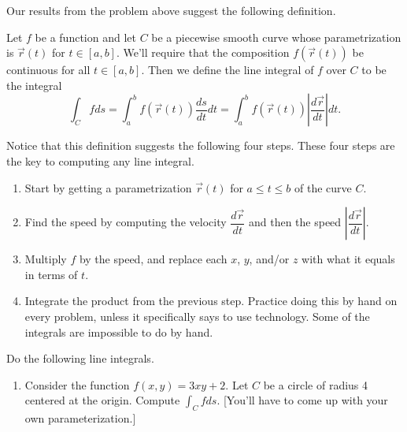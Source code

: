 Our results from the problem above suggest the following definition.

\begin{definition}%
 Let $f$ be a function and let $C$ be a piecewise smooth curve whose parametrization is $\vec r(t)$ for $t\in[a,b]$. We'll require that the composition $f(\vec r(t))$ be continuous for all $t\in [a,b]$. Then we define the line integral
of $f$ over $C$ to be the integral 
$$\int_C f ds 
= \int_a^b f(\vec r(t))\frac{ds}{dt}dt
= \int_a^b f(\vec r(t))\left|\frac{d\vec r}{dt}\right|dt.$$
\end{definition}

Notice that this definition suggests the following four steps.  These four steps are the key to computing any line integral. %
\begin{enumerate}
 \item Start by getting a parametrization $\vec r(t)$ for $a\leq t\leq b$ of the curve $C$. 
 \item Find the speed by computing the velocity $\dfrac{d\vec r}{dt}$ and then the speed $\left|\dfrac{d\vec r}{dt}\right|$.
 \item Multiply $f$ by the speed, and replace each $x$, $y$, and/or $z$ with what it equals in terms of $t$.
 \item 
{}%
Integrate the product from the previous step. Practice doing this by hand on every problem, unless it specifically says to use technology. Some of the integrals are impossible to do by hand.
\end{enumerate}

\begin{problem}%
%
Do the following line integrals.
\begin{enumerate}
\item {}%
 Consider the function $f(x,y)=3xy+2$. Let $C$ be a circle of radius 4 centered at the origin.  Compute $\int_C fds$.  [You'll have to come up with your own parameterization.]
\end{enumerate}
\end{problem}

